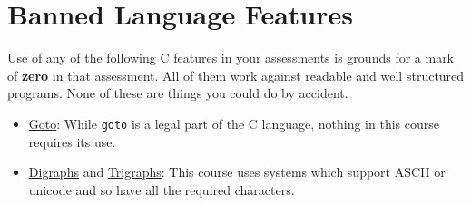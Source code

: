 \documentclass{article}
\begin{document}
\section{Banned Language Features}
Use of any of the following C features in your assessments is grounds for a mark of \textbf{zero} in that assessment.
All of them work against readable and well structured programs.
None of these are things you could do by accident.

\begin{itemize}
\item \underline{Goto}: While \texttt{goto} is a legal part of the C language, nothing in this course requires its use.
\item \underline{Digraphs} and \underline{Trigraphs}: This course uses systems which support ASCII or unicode and so have all the required characters.
\end{itemize}
\end{document}
